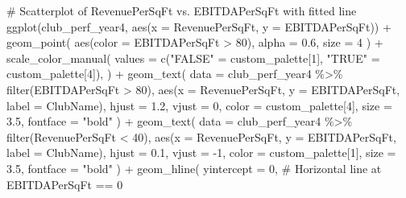 \documentclass[
  letterpaper,
  oneside,
  11pt]{article}
\newenvironment{Shaded}{\begin{snugshade}}{\end{snugshade}}
\newcommand{\AttributeTok}[1]{\textcolor[rgb]{0.40,0.45,0.13}{#1}}
\newcommand{\CommentTok}[1]{\textcolor[rgb]{0.37,0.37,0.37}{#1}}
\newcommand{\DecValTok}[1]{\textcolor[rgb]{0.68,0.00,0.00}{#1}}
\newcommand{\FloatTok}[1]{\textcolor[rgb]{0.68,0.00,0.00}{#1}}
\newcommand{\FunctionTok}[1]{\textcolor[rgb]{0.28,0.35,0.67}{#1}}
\newcommand{\NormalTok}[1]{\textcolor[rgb]{0.00,0.23,0.31}{#1}}
\newcommand{\OtherTok}[1]{\textcolor[rgb]{0.00,0.23,0.31}{#1}}
\newcommand{\SpecialCharTok}[1]{\textcolor[rgb]{0.37,0.37,0.37}{#1}}
\newcommand{\StringTok}[1]{\textcolor[rgb]{0.13,0.47,0.30}{#1}}
\begin{document}
\begin{Shaded}
\begin{Highlighting}[]
\CommentTok{\# Scatterplot of RevenuePerSqFt vs. EBITDAPerSqFt with fitted line}
\FunctionTok{ggplot}\NormalTok{(club\_perf\_year4, }\FunctionTok{aes}\NormalTok{(}\AttributeTok{x =}\NormalTok{ RevenuePerSqFt, }\AttributeTok{y =}\NormalTok{ EBITDAPerSqFt)) }\SpecialCharTok{+}
  \FunctionTok{geom\_point}\NormalTok{(}
    \FunctionTok{aes}\NormalTok{(}\AttributeTok{color =}\NormalTok{ EBITDAPerSqFt }\SpecialCharTok{\textgreater{}} \DecValTok{80}\NormalTok{),}
    \AttributeTok{alpha =} \FloatTok{0.6}\NormalTok{,}
    \AttributeTok{size =} \DecValTok{4}
\NormalTok{  ) }\SpecialCharTok{+}
  \FunctionTok{scale\_color\_manual}\NormalTok{(}
    \AttributeTok{values =} \FunctionTok{c}\NormalTok{(}\StringTok{"FALSE"} \OtherTok{=}\NormalTok{ custom\_palette[}\DecValTok{1}\NormalTok{], }\StringTok{"TRUE"} \OtherTok{=}\NormalTok{ custom\_palette[}\DecValTok{4}\NormalTok{]),}
\NormalTok{  ) }\SpecialCharTok{+}
  \FunctionTok{geom\_text}\NormalTok{(}
    \AttributeTok{data =}\NormalTok{ club\_perf\_year4 }\SpecialCharTok{\%\textgreater{}\%} \FunctionTok{filter}\NormalTok{(EBITDAPerSqFt }\SpecialCharTok{\textgreater{}} \DecValTok{80}\NormalTok{),}
    \FunctionTok{aes}\NormalTok{(}\AttributeTok{x =}\NormalTok{ RevenuePerSqFt, }\AttributeTok{y =}\NormalTok{ EBITDAPerSqFt, }\AttributeTok{label =}\NormalTok{ ClubName),}
    \AttributeTok{hjust =} \FloatTok{1.2}\NormalTok{,}
    \AttributeTok{vjust =} \DecValTok{0}\NormalTok{,}
    \AttributeTok{color =}\NormalTok{ custom\_palette[}\DecValTok{4}\NormalTok{],}
    \AttributeTok{size =} \FloatTok{3.5}\NormalTok{,}
    \AttributeTok{fontface =} \StringTok{"bold"}
\NormalTok{  ) }\SpecialCharTok{+}
  \FunctionTok{geom\_text}\NormalTok{(}
    \AttributeTok{data =}\NormalTok{ club\_perf\_year4 }\SpecialCharTok{\%\textgreater{}\%} \FunctionTok{filter}\NormalTok{(RevenuePerSqFt }\SpecialCharTok{\textless{}} \DecValTok{40}\NormalTok{),}
    \FunctionTok{aes}\NormalTok{(}\AttributeTok{x =}\NormalTok{ RevenuePerSqFt, }\AttributeTok{y =}\NormalTok{ EBITDAPerSqFt, }\AttributeTok{label =}\NormalTok{ ClubName),}
    \AttributeTok{hjust =} \FloatTok{0.1}\NormalTok{,}
    \AttributeTok{vjust =} \SpecialCharTok{{-}}\DecValTok{1}\NormalTok{,}
    \AttributeTok{color =}\NormalTok{ custom\_palette[}\DecValTok{1}\NormalTok{],}
    \AttributeTok{size =} \FloatTok{3.5}\NormalTok{,}
    \AttributeTok{fontface =} \StringTok{"bold"}
\NormalTok{  ) }\SpecialCharTok{+}
  \FunctionTok{geom\_hline}\NormalTok{(}
    \AttributeTok{yintercept =} \DecValTok{0}\NormalTok{,  }\CommentTok{\# Horizontal line at EBITDAPerSqFt == 0}

\end{Highlighting}
\end{Shaded}
\end{document}
